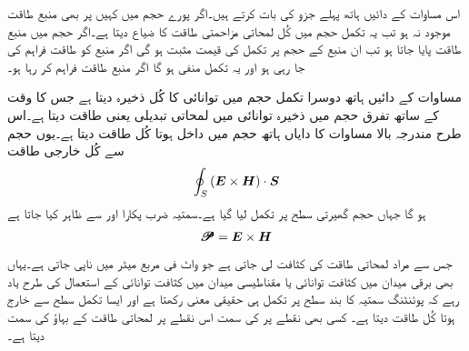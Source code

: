 اس مساوات کے دائیں ہاتھ پہلے جزو کی بات کرتے ہیں۔اگر پورے حجم میں کہیں پر بھی منبع طاقت موجود نہ ہو تب یہ تکمل حجم میں کُل لمحاتی مزاحمتی طاقت  کا ضیاع دیتا ہے۔اگر حجم میں منبع طاقت پایا جاتا ہو تب ان منبع کے حجم  پر تکمل کی قیمت مثبت ہو گی اگر منبع کو طاقت فراہم کی جا رہی ہو اور یہ تکمل منفی ہو گا اگر منبع طاقت فراہم کر رہا ہو۔

مساوات کے دائیں ہاتھ دوسرا تکمل حجم میں توانائی کا کُل ذخیرہ دیتا ہے جس کا وقت کے ساتھ تفرق حجم میں ذخیرہ توانائی میں لمحاتی تبدیلی یعنی طاقت دیتا ہے۔اس طرح مندرجہ بالا مساوات کا دایاں ہاتھ حجم میں داخل ہوتا کُل طاقت دیتا ہے۔یوں حجم سے کُل خارجی طاقت 
\begin{align*}
\oint_S \left({{\boldsymbol{E}}} \times {\ensuremath{{\boldsymbol{H}}}} \right) \cdot {\ensuremath{{\boldsymbol{S}}}}
\end{align*}
ہو گا جہاں حجم گھیرتی سطح پر تکمل لیا گیا ہے۔سمتیہ ضرب   پکارا اور  سے ظاہر کیا جاتا ہے
\begin{align}
\pmb{\mathscr{P}}={{\boldsymbol{E}}} \times {\ensuremath{{\boldsymbol{H}}}}
\end{align}
جس سے مراد لمحاتی طاقت کی کثافت لی جاتی ہے جو واٹ فی مربع میٹر  میں ناپی جاتی ہے۔یہاں بھی برقی میدان میں کثافت توانائی  یا مقناطیسی میدان میں کثافت توانائی  کے استعمال کی طرح یاد رہے کہ پوئنٹنگ سمتیہ کا بند سطح پر  تکمل ہی حقیقی معنی رکھتا ہے اور ایسا تکمل سطح سے خارج ہوتا کُل طاقت دیتا ہے۔ کسی بھی نقطے پر  کی سمت اس نقطے پر لمحاتی طاقت کے بہاؤ کی سمت دیتا ہے۔

